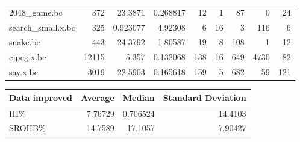 \begin{tabular}{lrrrrrrrr}
 2048\_game.bc         &      372 & 23.3871   &  0.268817  &   12 &    1 &     87 &     0 &    24 \\
 search\_small.x.bc    &      325 &  0.923077 &  4.92308   &    6 &   16 &      3 &   116 &     6 \\
 snake.bc             &      443 & 24.3792   &  1.80587   &   19 &    8 &    108 &     1 &    12 \\
 cjpeg.x.bc           &    12115 &  5.357    &  0.132068  &  138 &   16 &    649 &  4730 &    82 \\
 say.x.bc             &     3019 & 22.5903   &  0.165618  &  159 &    5 &    682 &    59 &   121 \\
\hline
\end{tabular}\begin{tabular}{lrrr}
\hline
 Data improved   &   Average &    Median &   Standard Deviation \\
\hline
 III\%            &   7.76729 &  0.706524 &             14.4103  \\
 SROHB\%          &  14.7589  & 17.1057   &              7.90427 \\
\hline
\end{tabular}